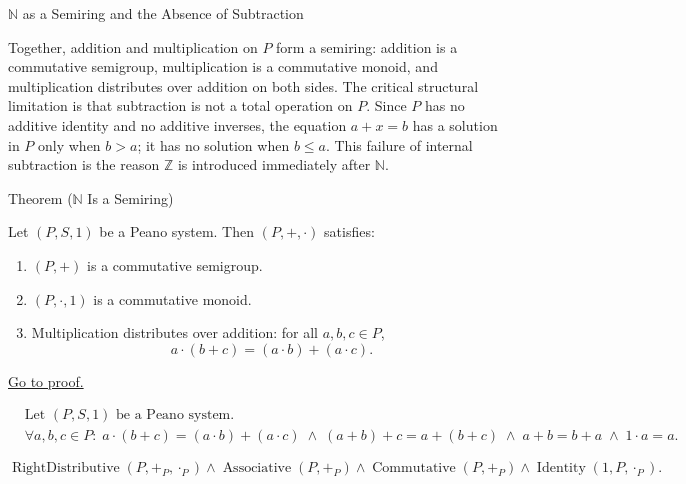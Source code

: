 \begin{topicbox}{$\mathbb{N}$ as a Semiring and the Absence of Subtraction}
\begin{exposition}
Together, addition and multiplication on $P$ form a semiring: addition is a
commutative semigroup, multiplication is a commutative monoid, and
multiplication distributes over addition on both sides. The critical structural
limitation is that subtraction is not a total operation on $P$. Since $P$
has no additive identity and no additive inverses, the equation $a + x = b$
has a solution in $P$ only when $b > a$; it has no solution when $b \le a$.
This failure of internal subtraction is the reason $\mathbb{Z}$ is introduced
immediately after $\mathbb{N}$.
\end{exposition}

\begin{theorembox}{Theorem ($\mathbb{N}$ Is a Semiring)}
\begin{theorem}
\label{thm:n-is-semiring}
Let $(P,S,1)$ be a Peano system. Then $(P,+,\cdot)$ satisfies:
\begin{enumerate}
  \item $(P,+)$ is a commutative semigroup.
  \item $(P,\cdot,1)$ is a commutative monoid.
  \item Multiplication distributes over addition: for all $a,b,c \in P$,
  \[
  a \cdot (b+c) = (a \cdot b) + (a \cdot c).
  \]
\end{enumerate}
\hyperref[prf:n-is-semiring]{Go to proof.}
\end{theorem}
\end{theorembox}

\begin{remark*}
\[
\begin{aligned}
&\text{Let } (P,S,1) \text{ be a Peano system.}\\
&\forall a,b,c \in P:\;
a \cdot (b+c) = (a \cdot b) + (a \cdot c)
\;\land\;
(a+b)+c = a+(b+c)
\;\land\;
a+b = b+a
\;\land\;
1 \cdot a = a.
\end{aligned}
\]
\end{remark*}

\begin{remark*}
\[
\operatorname{RightDistributive}(P,+_P,\cdot_P)
\land
\operatorname{Associative}(P,+_P)
\land
\operatorname{Commutative}(P,+_P)
\land
\operatorname{Identity}(1,P,\cdot_P).
\]
\end{remark*}


\end{topicbox}
